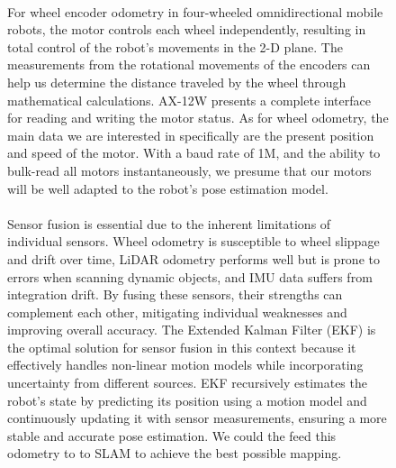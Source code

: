 \begin{figure} [H]
\paragraph*{}
For wheel encoder odometry in four-wheeled omnidirectional mobile robots, the motor controls each wheel independently, resulting in total control of the robot's movements in the 2-D plane. The measurements from the rotational movements of the encoders can help us determine the distance traveled by the wheel through mathematical calculations.
AX-12W presents a complete interface for reading and writing the motor status. As for wheel odometry, the main data we are interested in specifically are the present position and speed of the motor. With a baud rate of 1M, and the ability to bulk-read all motors instantaneously, we presume that our motors will be well adapted to the robot's pose estimation model. \cite{phunopas2018motion}

\paragraph*{}
Sensor fusion is essential due to the inherent limitations of individual sensors. Wheel odometry is susceptible to wheel slippage and drift over time, LiDAR odometry performs well but is prone to errors when scanning dynamic objects, and IMU data suffers from integration drift. By fusing these sensors, their strengths can complement each other, mitigating individual weaknesses and improving overall accuracy. The Extended Kalman Filter (EKF) is the optimal solution for sensor fusion in this context because it effectively handles non-linear motion models while incorporating uncertainty from different sources. EKF recursively estimates the robot’s state by predicting its position using a motion model and continuously updating it with sensor measurements, ensuring a more stable and accurate pose estimation. We could the feed this odometry to to SLAM to achieve the best possible mapping.

\end{figure}
